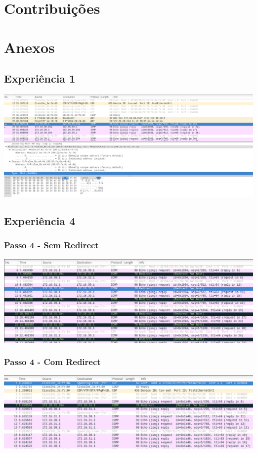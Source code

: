 \documentclass[a4paper]{article}
\begin{document}
\section{Contribuições}

\section{Anexos}
\subsection{Experiência 1}

\includegraphics[scale=0.35]{Exp1.png}

\subsection{Experiência 4}
\subsubsection{Passo 4 - Sem Redirect}

\includegraphics[scale=0.35]{Exp4-4-withoutRedirect.png}

\subsubsection{Passo 4 - Com Redirect}

\includegraphics[scale=0.35]{Exp4-4-withRedirect.png}
\end{document}
